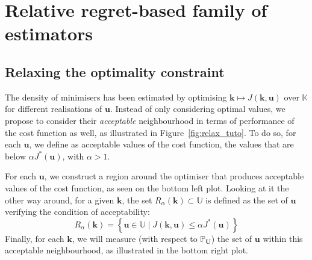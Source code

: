 \documentclass[preprint, 1p]{elsarticle}
\newcommand{\Prob}{\mathbb{P}}
\newcommand{\Kspace}{\mathbb{K}}
\newcommand{\Uspace}{\mathbb{U}}
\newcommand{\elise}[1]{{\itshape\color{red} ({#1})}}
\begin{document}



\section{Relative regret-based family of estimators}%
\label{sec:relax_constraint}
\subsection{Relaxing the optimality constraint}
The density of minimisers has been estimated by optimising $\mathbf{k}\mapsto J(\mathbf{k},\mathbf{u})$ over $\Kspace$ for different realisations of $\mathbf{u}$. Instead of only considering  optimal values, we propose to consider their {\it acceptable} neighbourhood in terms of performance of the cost function as well, as illustrated in Figure~\ref{fig:relax_tuto}. 
To do so, for each $\mathbf{u}$, we define as acceptable values of the cost function, the values that are below $\alpha J^*(\mathbf{u})$, with $\alpha > 1$. 

For each $\mathbf{u}$, we construct a region around the optimiser that produces acceptable values of the cost function, as seen on the bottom left plot. Looking at it the other way around, for a given $\mathbf{k}$, the set $R_{\alpha}(\mathbf{k}) \subset \Uspace$ is defined as the set of $\mathbf{u}$ verifying the condition of acceptability:
\begin{equation}
\label{eq:def_Ralpha}
R_{\alpha}(\mathbf{k}) = \left\{ \mathbf{u} \in \Uspace \mid J(\mathbf{k},\mathbf{u}) \leq \alpha J^*(\mathbf{u}) \right\}
\end{equation}
Finally, for each $\mathbf{k}$, we will measure (with respect to $\Prob_{\mathbf{U}}$) the set of $\mathbf{u}$ within this acceptable neighbourhood, as illustrated in the bottom right plot. 
\end{document}
